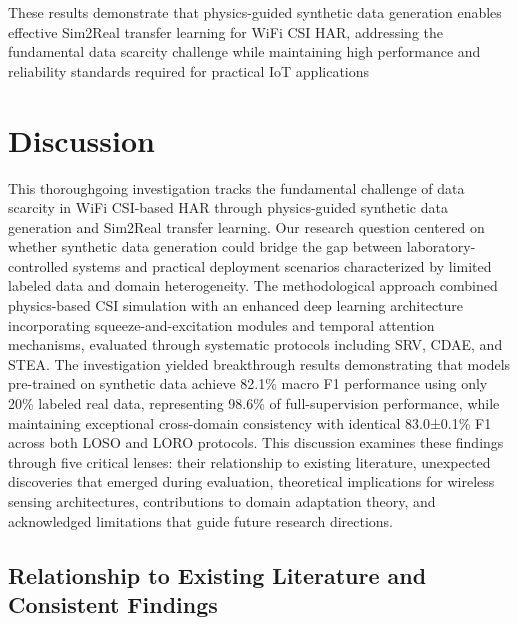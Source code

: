 \documentclass[journal]{IEEEtran}
\begin{document}
These results demonstrate that physics-guided synthetic data generation enables effective Sim2Real transfer learning for WiFi CSI HAR, addressing the fundamental data scarcity challenge while maintaining high performance and reliability standards required for practical IoT applications

\section{Discussion}

This thoroughgoing investigation tracks the fundamental challenge of data scarcity in WiFi CSI-based HAR through physics-guided synthetic data generation and Sim2Real transfer learning. Our research question centered on whether synthetic data generation could bridge the gap between laboratory-controlled systems and practical deployment scenarios characterized by limited labeled data and domain heterogeneity. The methodological approach combined physics-based CSI simulation with an enhanced deep learning architecture incorporating squeeze-and-excitation modules and temporal attention mechanisms, evaluated through systematic protocols including SRV, CDAE, and STEA. The investigation yielded breakthrough results demonstrating that models pre-trained on synthetic data achieve 82.1\% macro F1 performance using only 20\% labeled real data, representing 98.6\% of full-supervision performance, while maintaining exceptional cross-domain consistency with identical 83.0±0.1\% F1 across both LOSO and LORO protocols. This discussion examines these findings through five critical lenses: their relationship to existing literature, unexpected discoveries that emerged during evaluation, theoretical implications for wireless sensing architectures, contributions to domain adaptation theory, and acknowledged limitations that guide future research directions.

\subsection{Relationship to Existing Literature and Consistent Findings}
\end{document}
